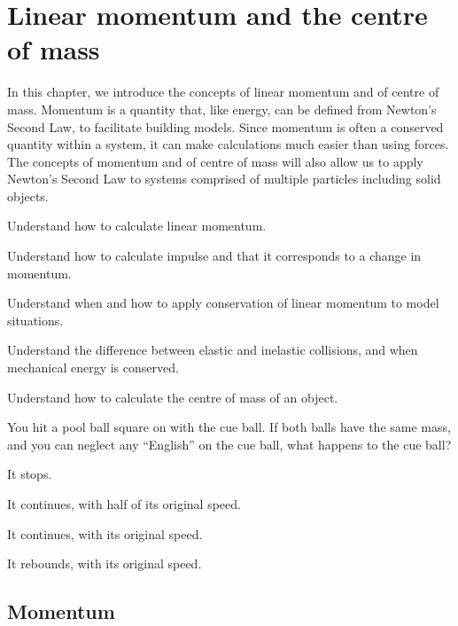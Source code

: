 
\chapter{Linear momentum and the centre of mass}
\label{chapter:momentumandcm}
In this chapter, we introduce the concepts of linear momentum and of centre of mass. Momentum is a quantity that, like energy, can be defined from Newton's Second Law, to facilitate building models. Since momentum is often a conserved quantity within a system, it can make calculations much easier than using forces. The concepts of momentum and of centre of mass will also allow us to apply Newton's Second Law to systems comprised of multiple particles including solid objects. 

\begin{learningObjectives}{
 \item Understand how to calculate linear momentum.
 \item Understand how to calculate impulse and that it corresponds to a change in momentum.
 \item Understand when and how to apply conservation of linear momentum to model situations.
 \item Understand the difference between elastic and inelastic collisions, and when mechanical energy is conserved.
 \item Understand how to calculate the centre of mass of an object.
}
\end{learningObjectives}

\begin{opening}
\begin{MCquestion}{You hit a pool ball square on with the cue ball. If both balls have the same mass, and you can neglect any ``English'' on the cue ball, what happens to the cue ball?}
\item It stops.
\item It continues, with half of its original speed.
\item It continues, with its original speed.
\item It rebounds, with its original speed.
\end{MCquestion}
\end{opening}


\section{Momentum}
